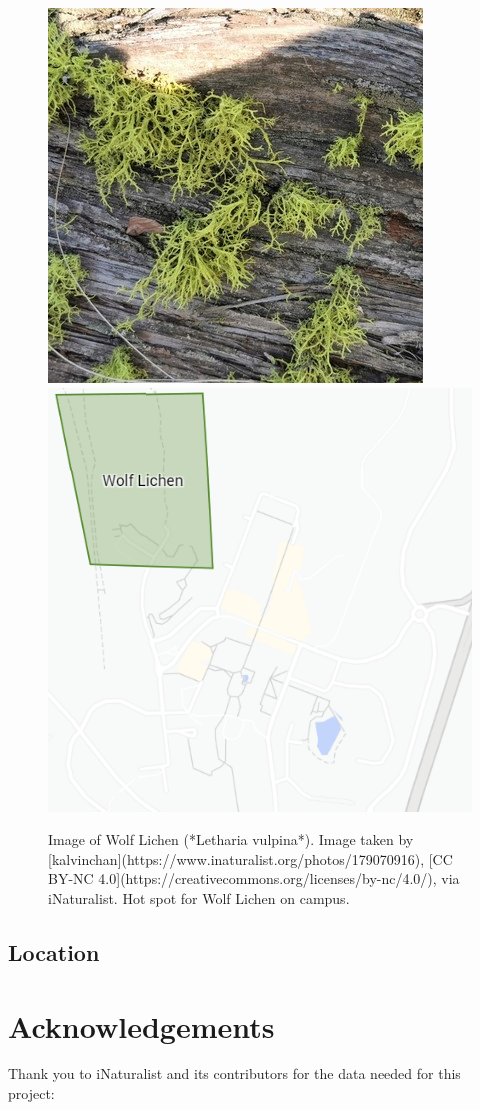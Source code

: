 \documentclass[
]{book}
\begin{document}
\begin{figure}

{\centering \includegraphics[width=0.49\linewidth,height=0.2\textheight]{plant_images/wolf_inat_11} \includegraphics[width=0.49\linewidth,height=0.2\textheight]{plant_images/wolflichen_hotspot_11} 

}

\caption{Image of Wolf Lichen (*Letharia vulpina*). Image taken by [kalvinchan](https://www.inaturalist.org/photos/179070916), [CC BY-NC 4.0](https://creativecommons.org/licenses/by-nc/4.0/), via iNaturalist. Hot spot for Wolf Lichen on campus.}\label{fig:unnamed-chunk-15}
\end{figure}

\hypertarget{location-2}{%
\section{Location}\label{location-2}}

\hypertarget{acknowledgements}{%
\chapter{Acknowledgements}\label{acknowledgements}}

Thank you to iNaturalist and its contributors for the data needed for this project:
\end{document}
